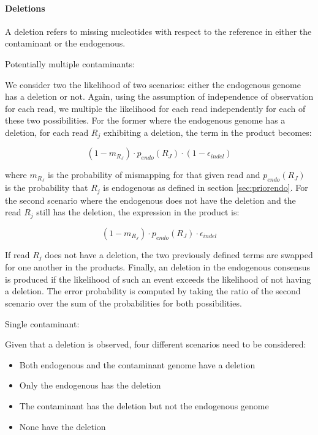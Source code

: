 \documentclass[a4paper,12pt]{article}
\begin{document}
\noindent \paragraph{Deletions}

A deletion refers to missing nucleotides with respect to the reference in either the contaminant or the endogenous.

\noindent  Potentially multiple contaminants:

We consider two the likelihood of two scenarios: either the endogenous genome has a deletion or not. Again, using the assumption of independence of observation for each read, we multiple the likelihood for each read independently for each of these two possibilities. For the former where the endogenous genome has a deletion, for each read $R_j$ exhibiting a deletion, the term in the product becomes:

\begin{equation}
 (1-m_{R_J}) \cdot p_{endo}(R_J) \cdot (1-\epsilon_{indel})
\label{eqn:correctindel}
\end{equation}

\noindent where $m_{R_J}$ is the probability of mismapping for that given read and $p_{endo}(R_J)$ is the probability that $R_j$ is endogenous as defined in section \ref{sec:priorendo}. For the second scenario where the endogenous does not have the deletion and the read $R_j$ still has the deletion, the expression in the product is:

\begin{equation}
 (1-m_{R_J}) \cdot p_{endo}(R_J) \cdot \epsilon_{indel}
\label{eqn:incorrectindel}
\end{equation}

\noindent If read $R_j$ does not have a deletion, the two previously defined terms are swapped for one another in the products. Finally, an deletion in the endogenous consensus is produced if the likelihood of such an event exceeds the likelihood of not having a deletion. The error probability is computed by taking the ratio of the second scenario over the sum of the probabilities for both possibilities.

\noindent Single contaminant:

Given that a deletion is observed, four different scenarios need to be considered:

\begin{itemize}
\item Both endogenous and the contaminant genome have a deletion
\item Only the endogenous has the deletion
\item The contaminant has the deletion but not the endogenous genome
\item None have the deletion
\end{itemize}
\end{document}
